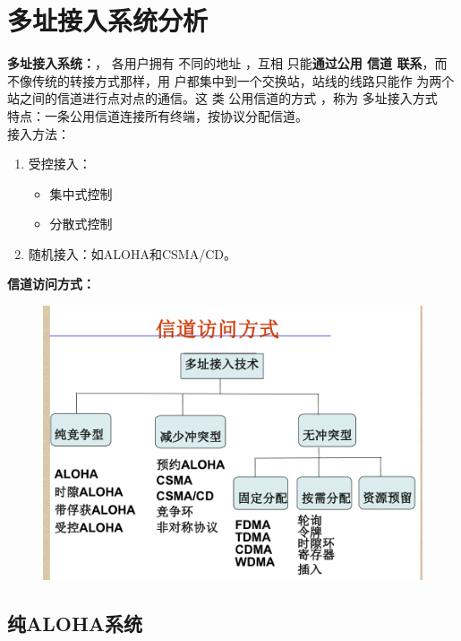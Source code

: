 \chapter{多址接入系统分析}
\textbf{多址接入系统：}， 各用户拥有 不同的地址 ，互相 只能\textbf{通过公用
信道 联系}，而不像传统的转接方式那样，用
户都集中到一个交换站，站线的线路只能作
为两个站之间的信道进行点对点的通信。这
类 公用信道的方式 ，称为 多址接入方式\\
特点：一条公用信道连接所有终端，按协议分配信道。\\
接入方法：
\begin{enumerate}
	\item 受控接入：
	\begin{itemize}
		\item 集中式控制
		\item 分散式控制
	\end{itemize}
	\item 随机接入：如ALOHA和CSMA/CD。
\end{enumerate}
\textbf{信道访问方式：}
\begin{figure}[H]
	\centering
	\includegraphics[width=0.7\linewidth]{figures/screenshot001}
	\caption{}
	\label{fig:screenshot001}
\end{figure}
\section{纯ALOHA系统}
